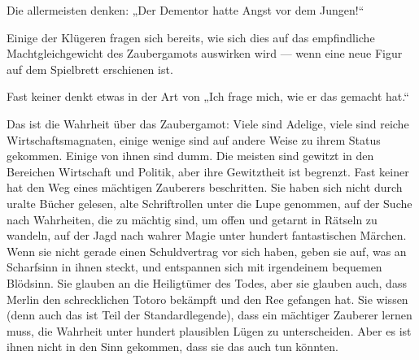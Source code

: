 Die allermeisten denken:
„Der Dementor hatte Angst vor dem Jungen!“

Einige der Klügeren fragen sich bereits, wie sich dies auf das empfindliche Machtgleichgewicht des Zaubergamots auswirken wird — wenn eine neue Figur auf dem Spielbrett erschienen ist.

Fast keiner denkt etwas in der Art von
„Ich frage mich, wie er das gemacht hat.“

Das ist die Wahrheit über das Zaubergamot: Viele sind Adelige, viele sind reiche Wirtschaftsmagnaten, einige wenige sind auf andere Weise zu ihrem Status gekommen. Einige von ihnen sind dumm. Die meisten sind gewitzt in den Bereichen Wirtschaft und Politik, aber ihre Gewitztheit ist begrenzt. Fast keiner hat den Weg eines mächtigen Zauberers beschritten. Sie haben sich nicht durch uralte Bücher gelesen, alte Schriftrollen unter die Lupe genommen, auf der Suche nach Wahrheiten, die zu mächtig sind, um offen und getarnt in Rätseln zu wandeln, auf der Jagd nach wahrer Magie unter hundert fantastischen Märchen. Wenn sie nicht gerade einen Schuldvertrag vor sich haben, geben sie auf, was an Scharfsinn in ihnen steckt, und entspannen sich mit irgendeinem bequemen Blödsinn. Sie glauben an die Heiligtümer des Todes, aber sie glauben auch, dass Merlin den schrecklichen Totoro bekämpft und den Ree gefangen hat. Sie wissen (denn auch das ist Teil der Standardlegende), dass ein mächtiger Zauberer lernen muss, die Wahrheit unter hundert plausiblen Lügen zu unterscheiden. Aber es ist ihnen nicht in den Sinn gekommen, dass sie das auch tun könnten.


